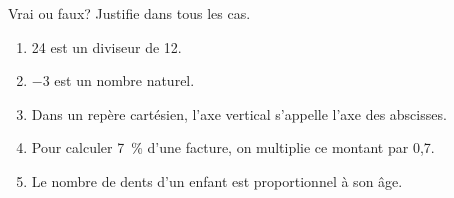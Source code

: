 %
%
    Vrai ou faux? Justifie dans tous les cas.
    \begin{enumerate}
        \item 24 est un diviseur de 12.
        \item \(-3\) est un nombre naturel.
        \item Dans un repère cartésien, l'axe vertical s'appelle l'axe des abscisses.
        \item Pour calculer \SI{7}{\%} d'une facture, on multiplie ce montant par 0,7.
        \item Le nombre de dents d'un enfant est proportionnel à son âge.
    \end{enumerate}
